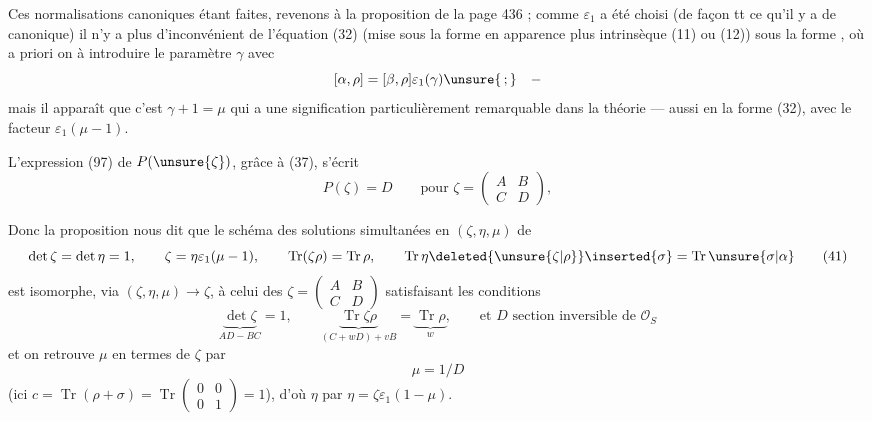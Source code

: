 
Ces normalisations canoniques étant faites, revenons à la proposition de la page 436 ; comme $\varepsilon_1$ a été choisi
(de façon tt ce qu'il y a de canonique) il n'y a plus d'inconvénient de
\uline{} l'équation (32) (mise sous la forme en apparence plus intrinsèque
(11) ou (12)) sous la forme  ,
où a priori on  à introduire le paramètre $\gamma$ avec
\[
[\alpha,\rho]=[\beta,\rho]\varepsilon_1(\gamma)\unsure{\,;}\quad -
\]
mais il apparaît que c'est $\gamma+1=\mu$ qui a une signification particulièrement remarquable
dans la théorie --- aussi en  la forme (32), avec le facteur $\varepsilon_1(\mu-1)$.

L'expression (97) de $P(\unsure{\zeta})$, grâce à (37), s'écrit
\[
P(\zeta)=D\qquad\text{pour }\zeta=\begin{pmatrix}A&B\\C&D\end{pmatrix}, \tag{40}
\]


Donc la proposition nous dit que le schéma 
des solutions simultanées en $(\zeta,\eta,\mu)$ de
\[
\det\zeta=\det\eta=1,\qquad \zeta=\eta\varepsilon_1(\mu-1),\qquad
\operatorname{Tr}(\zeta\rho)=\operatorname{Tr}\rho,\qquad
\operatorname{Tr}\eta\deleted{\unsure{\zeta|\rho}}\inserted{\sigma}
=\operatorname{Tr}\unsure{\sigma|\alpha} \tag{41}
\]
est isomorphe, via $(\zeta,\eta,\mu)\longrightarrow\zeta$, à celui des
$\zeta=\begin{pmatrix}A&B\\C&D\end{pmatrix}$ satisfaisant les conditions
\[
\underbrace{\det\zeta}_{AD-BC}=1,\qquad
\underbrace{\operatorname{Tr}\zeta\rho}_{(C+wD)+vB}
=\underbrace{\operatorname{Tr}\rho}_{w},\qquad
\text{et }D\text{ section inversible de }\mathcal O_S \tag{42}
\]
et on retrouve $\mu$ en termes de $\zeta$ par
\[
\mu=1/D \tag{43}
\]
(ici $c=\operatorname{Tr}(\rho+\sigma)=\operatorname{Tr}\begin{pmatrix}0&0\\0&1\end{pmatrix}=1$),
d'où $\eta$ par $\eta=\zeta\varepsilon_1(1-\mu)$.

